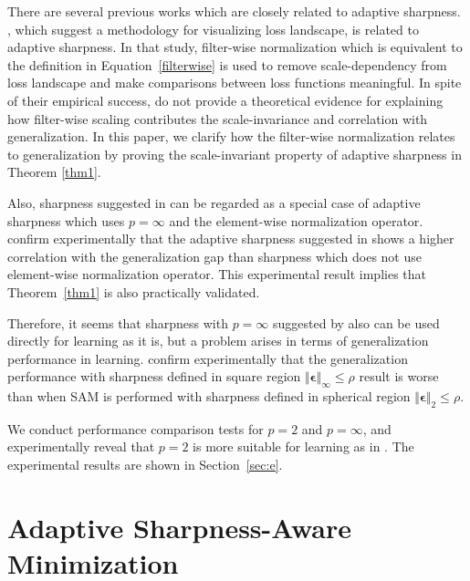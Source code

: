 \documentclass{article}
\begin{document}
There are several previous works which are closely related to adaptive sharpness.
\citet{li2018visualizing}, which suggest a methodology for visualizing loss landscape, is related to adaptive sharpness. In that study, filter-wise normalization which is equivalent to the definition in Equation~\ref{filterwise} is used to remove scale-dependency from loss landscape and make comparisons between loss functions meaningful. In spite of their empirical success, \citet{li2018visualizing} do not provide a theoretical evidence for explaining how filter-wise scaling contributes the scale-invariance and correlation with generalization. In this paper, we clarify how the filter-wise normalization relates to generalization by proving the scale-invariant property of adaptive sharpness in Theorem \ref{thm1}.

Also, sharpness suggested in \citet{keskar2017large} can be regarded as a special case of adaptive sharpness which uses $p=\infty$ and the element-wise normalization operator.
\citet{jiang2019fantastic} confirm experimentally that the adaptive sharpness suggested in \citet{keskar2017large} shows a higher correlation with the generalization gap than sharpness which does not use element-wise normalization operator.
This experimental result implies that Theorem~\ref{thm1} is also practically validated.

Therefore, it seems that sharpness with $p=\infty$ suggested by \citet{keskar2017large} also can be used directly for learning as it is, but a problem arises in terms of generalization performance in learning. \citet{foret2021sharpnessaware} confirm experimentally that the generalization performance with sharpness defined in square region $\Vert \bm{\epsilon}\Vert _{\infty} \leq \rho$ result is worse than when SAM is performed with sharpness defined in spherical region $\Vert \bm{\epsilon}\Vert _{2} \leq \rho$.

We conduct performance comparison tests for $p=2$ and $p=\infty$, and experimentally reveal that $p=2$ is more suitable for learning as in \citet{foret2021sharpnessaware}. The experimental results are shown in Section~\ref{sec:e}.


\section{Adaptive Sharpness-Aware Minimization} \label{sec:a}
\end{document}
